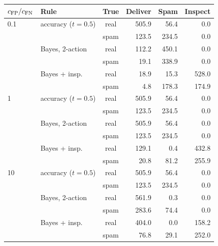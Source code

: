 \begin{tabular}{llcrrr}
\toprule
$c_{\mathrm{FP}}/c_{\mathrm{FN}}$ & Rule & True & Deliver & Spam & Inspect \\
\midrule
0.1 & accuracy ($t=0.5$) & real & 505.9 & 56.4 & 0.0 \\
 &  & spam & 123.5 & 234.5 & 0.0 \\
 & Bayes, 2-action & real & 112.2 & 450.1 & 0.0 \\
 &  & spam & 19.1 & 338.9 & 0.0 \\
 & Bayes + insp. & real & 18.9 & 15.3 & 528.0 \\
 &  & spam & 4.8 & 178.3 & 174.9 \\
\midrule
1 & accuracy ($t=0.5$) & real & 505.9 & 56.4 & 0.0 \\
 &  & spam & 123.5 & 234.5 & 0.0 \\
 & Bayes, 2-action & real & 505.9 & 56.4 & 0.0 \\
 &  & spam & 123.5 & 234.5 & 0.0 \\
 & Bayes + insp. & real & 129.1 & 0.4 & 432.8 \\
 &  & spam & 20.8 & 81.2 & 255.9 \\
\midrule
10 & accuracy ($t=0.5$) & real & 505.9 & 56.4 & 0.0 \\
 &  & spam & 123.5 & 234.5 & 0.0 \\
 & Bayes, 2-action & real & 561.9 & 0.3 & 0.0 \\
 &  & spam & 283.6 & 74.4 & 0.0 \\
 & Bayes + insp. & real & 404.0 & 0.0 & 158.2 \\
 &  & spam & 76.8 & 29.1 & 252.0 \\
\bottomrule
\end{tabular}

